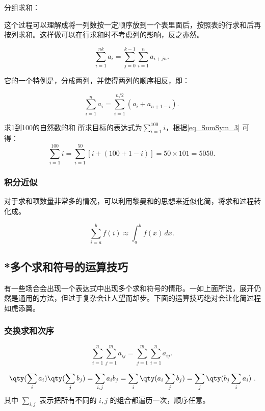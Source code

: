 分组求和：

这个过程可以理解成将一列数按一定顺序放到一个表里面后，按照表的行求和后再按列求和。这样做可以在行求和时不考虑列的影响，反之亦然。

\begin{equation}
\sum_{i=1}^{nk} a_i = \sum_{j=0}^{k-1} \sum_{i=1}^n a_{i+jn}.~
\end{equation}

它的一个特例是，分成两列，并使得两列的顺序相反，即：

\begin{equation}\label{eq_SumSym_3}
\sum_{i=1}^n a_i = \sum_{i=1}^{n/2} (a_i + a_{n+1-i}).~
\end{equation}

\begin{example}{求1到100的自然数的和}
所求目标的表达式为$\sum\limits_{i=1}^{100} i$，根据\autoref{eq_SumSym_3} 可得：
$$\sum\limits_{i=1}^{100} i= \sum_{i=1}^{50} [i + (100+1-i)]=50\times101=5050.~$$
\end{example}

\subsubsection{积分近似}

对于求和项数量非常多的情况，可以利用黎曼和的思想来近似化简，将求和过程转化成。

\begin{equation}
\sum_{i=a}^b f(i) \approx \int_a^b f(x) \, dx.~
\end{equation}


\subsection{*多个求和符号的运算技巧}

有一些场合会出现一个表达式中出现多个求和符号的情形。一如上面所说，展开仍然是通用的方法，但过于复杂会让人望而却步。下面的运算技巧绝对会让化简过程如虎添翼。

\subsubsection{交换求和次序}

\begin{equation}
\sum_{i=1}^n \sum_{j=1}^m a_{ij} = \sum_{j=1}^m \sum_{i=1}^n a_{ij}.~
\end{equation}


\begin{equation}
\qty(\sum_i a_i) \qty(\sum_j b_j) = \sum_{i,j} a_i b_j = \sum_i \qty(a_i \sum_j b_j) = \sum_j \qty(b_j \sum_i a_i)~.
\end{equation}
其中 $\sum\limits_{i,j}$ 表示把所有不同的 $i,j$ 的组合都遍历一次，顺序任意。


